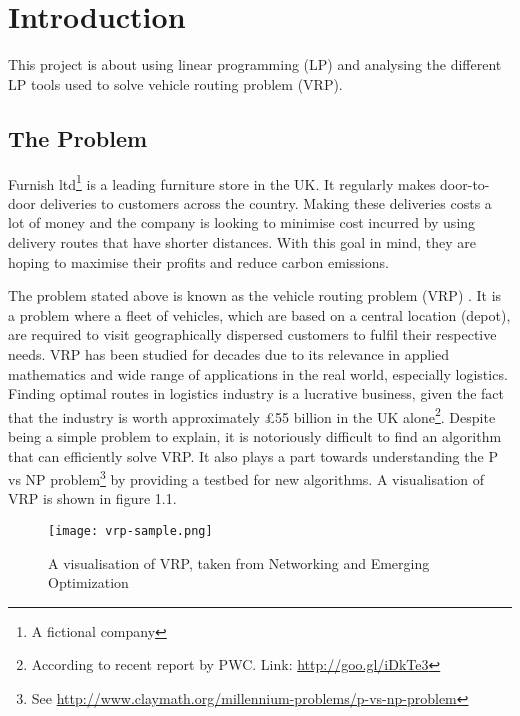 \chapter{Introduction}

This project is about using linear programming (LP) and analysing the different LP tools used to solve vehicle routing problem (VRP).

\section{The Problem}
Furnish ltd\footnote{A fictional company} is a leading furniture store in the UK. It regularly makes door-to-door deliveries to customers
across the country. Making these deliveries costs a lot of money and the company is looking to minimise cost incurred by using delivery routes
that have shorter distances. With this goal in mind, they are hoping to maximise their profits and reduce carbon emissions.

The problem stated above is known as the vehicle routing problem (VRP) \cite{Dantzig1959, Daneshzand2011}. It is a problem where a fleet of vehicles,
which are based on a central location (depot), are required to visit geographically dispersed customers
 to fulfil their respective needs.
VRP has been studied for decades due to its relevance in applied mathematics and wide range of applications in the real world, especially logistics.
Finding optimal routes in logistics industry is a lucrative business, given the fact that the industry is worth approximately \pounds55 billion
in the UK alone\footnote{According to recent report by PWC. Link: \url{http://goo.gl/iDkTe3}}.
Despite being a simple problem to explain, it is notoriously difficult to find an algorithm that can efficiently solve VRP.
It also plays a part towards understanding the P vs NP problem\footnote{
See \url{http://www.claymath.org/millennium-problems/p-vs-np-problem}} by providing a testbed for new algorithms.
A visualisation of VRP is shown in figure 1.1.
\vspace{0.5cm}
\begin{figure}[!ht]
  \centering
    \texttt{[image: vrp-sample.png]}
    \caption{A visualisation of VRP, taken from Networking and Emerging Optimization \cite{neo:vrp}}
\end{figure}

